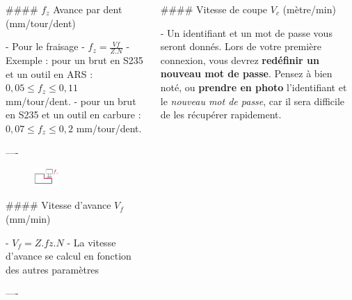 \documentclass{beamer}
\begin{document}
\begin{frame}[fragile]
\begin{columns}
\begin{column}{.4\textwidth}
\end{column}

\end{columns}

\bigskip

\begin{columns}[T]

\begin{column}{.46\textwidth}

\begin{markdown}

#### $f_z$ Avance par dent (mm/tour/dent)

- Pour le fraisage
- $f_z = \frac{Vf}{Z.N}$
- Exemple : pour un brut en S235 et un outil en ARS : $0,05 \leq f_z \leq 0,11$ mm/tour/dent.
- pour un brut en S235 et un outil en carbure : $0,07 \leq f_z \leq 0,2$ mm/tour/dent.

----

\begin{figure}
\includegraphics[width=0.3\textwidth]{fz1.png}
\end{figure}

#### Vitesse d'avance $V_f$ (mm/min)

- $V_f=Z.fz.N$
- La vitesse d'avance se calcul en fonction des autres paramètres




----


\end{markdown}



\end{column}









\begin{column}{.46\textwidth}

\begin{markdown}

#### Vitesse de coupe $V_c$ (mètre/min)

- Un identifiant et un mot de passe vous seront donnés. Lors de votre première connexion, vous devrez \textbf{redéfinir un nouveau mot de passe}. Pensez à bien noté, ou \textbf{prendre en photo} l'identifiant et le \textit{nouveau mot de passe}, car il sera difficile de les récupérer rapidement.


\end{markdown}
\end{column}
\end{columns}
\end{frame}
\end{document}
